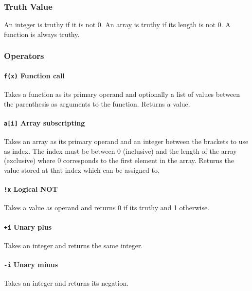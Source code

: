 \documentclass[12pt, a4paper]{article}
\begin{document}
\subsubsection{Truth Value}

An integer is truthy if it is not 0. An array is truthy if its length is not 0. A function is always truthy.

\subsubsection{Operators}

\paragraph{\texttt{f(x)} \quad Function call}

Takes a function as its primary operand and optionally a list of values between the parenthesis as arguments to the function. Returns a value.

\paragraph{\texttt{a[i]} \quad Array subscripting}

Takes an array as its primary operand and an integer between the brackets to use as index. The index must be between 0 (inclusive) and the length of the array (exclusive) where 0 corresponds to the first element in the array. Returns the value stored at that index which can be assigned to.


\paragraph{\texttt{!x} \quad Logical NOT}

Takes a value as operand and returns 0 if its truthy and 1 otherwise.

\paragraph{\texttt{+i} \quad Unary plus}

Takes an integer and returns the same integer.

\paragraph{\texttt{-i} \quad Unary minus}

Takes an integer and returns its negation.
\end{document}
